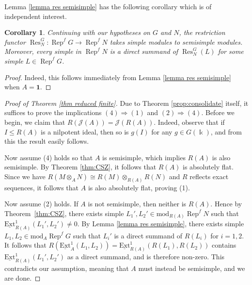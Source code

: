 \documentclass[11pt]{amsart}
\def\mod{\mathrm{ mod}}
\def\Rep{\operatorname{Rep}}
\def\Ext{\mathrm{Ext}}
\newtheorem{cor}[thm]{Corollary}
\theoremstyle{definition}
\theoremstyle{remark}
\numberwithin{equation}{section}
\newcommand{\uExt}{\underline{\Ext}}
\begin{document}
Lemma \ref{lemma res semisimple} has the following corollary which is of independent interest.
\begin{cor}
    Continuing with our hypotheses on $G$ and $N$, the restriction functor $\operatorname{Res}_N^G:\Rep^f G\to\Rep^f N$ takes simple modules to semisimple modules.  Moreover, every simple in $\Rep^f N$ is a direct summand of $\operatorname{Res}_N^G(L)$ for some simple $L\in\Rep^f G$.
\end{cor}

\begin{proof}
    Indeed, this follows immediately from Lemma \ref{lemma res semisimple} when $A=\mathbf{1}$.
\end{proof}



\begin{proof}[Proof of Theorem \ref{thm reduced finite}]
    Due to Theorem \ref{prop:consolidate} itself, it suffices to prove the implications $(4)\Rightarrow(1)$ and $(2)\Rightarrow (4)$. Before we begin, we claim that $R(\mathcal{J}(A))=\mathcal{J}(R(A))$.  Indeed, observe that if $I\leq R(A)$ is a nilpotent ideal, then so is $g(I)$ for any $g\in G(\Bbbk)$, and from this the result easily follows.
    
    Now assume (4) holds so that $A$ is semisimple, which implies $R(A)$ is also semisimple.  By Theorem \ref{thm:CSZ}, it follows that $R(A)$ is absolutely flat.  Since we have $R(M\otimes_A N)\cong R(M)\otimes_{R(A)}R(N)$ and $R$ reflects exact sequences, it follows that $A$ is also absolutely flat, proving (1).  
    

    Now assume (2) holds.  If $A$ is not semisimple, then neither is $R(A)$.  Hence by Theorem~\ref{thm:CSZ}, there exists simple $L_1',L_2'\in\mod_{R(A)}\Rep^f N$ such that $\uExt^1_{R(A)}(L_1',L_2')\neq0$.  By Lemma \ref{lemma res semisimple}, there exists simple $L_1,L_2\in\mod_A\Rep^f G$ such that $L_i'$ is a direct summand of $R(L_i)$ for $i=1,2$.  It follows that $R(\uExt^1_A(L_1,L_2))=\uExt^1_{R(A)}(R(L_1),R(L_2))$ contains $\uExt^1_{R(A)}(L_1',L_2')$ as a direct summand, and is therefore non-zero.  This contradicts our assumption, meaning that $A$ must instead be semisimple, and we are done.
\end{proof}
\end{document}
